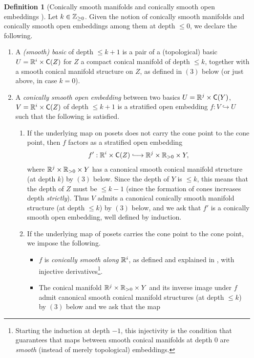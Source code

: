\documentclass[10pt, reqno, twoside
, final
]{amsart}
\numberwithin{equation}{subsection}%
\theoremstyle{definition}
\newtheorem{defn}{Definition}[subsection]
\theoremstyle{definition}
\theoremstyle{definition}
\theoremstyle{definition}
\theoremstyle{definition}
\theoremstyle{definition}
\theoremstyle{definition}
\theoremstyle{definition}
\theoremstyle{definition}
\theoremstyle{plain}
\theoremstyle{definition}
\theoremstyle{plain}
\theoremstyle{definition}
\theoremstyle{plain}
\theoremstyle{definition}
\theoremstyle{definition}
\theoremstyle{plain}
\theoremstyle{plain}
\theoremstyle{definition}
\theoremstyle{plain}
\theoremstyle{plain}
\theoremstyle{plain}
\begin{document}
\begin{defn}[Conically smooth manifolds and conically smooth open embeddings \cite{AFT-local-structures}]\label{defn:consmfmfd}
Let $k\in \mathbb{Z}_{\geq 0}$. Given the notion of conically smooth manifolds and conically smooth open embeddings among them at depth $\leq 0$, we declare the following. 
\begin{enumerate}[$(1)$]
    \item A \emph{(smooth) basic} of depth $\leq k+1$ is a pair of a (topological) basic $U=\mathbb{R}^i \times \mathsf{C}(Z)$ for $Z$ a compact conical manifold of depth $\leq k$, together with a smooth conical manifold structure on $Z$, as defined in $(3)$ below (or just above, in case $k=0$). 
    \item A \emph{conically smooth open embedding} between two basics $U=\mathbb{R}^j\times \mathsf{C}(Y)$, $V=\mathbb{R}^i\times \mathsf{C}(Z)$ of depth $\leq k+1$ is a stratified open embedding $f:V\hookrightarrow U$ such that the following is satisfied.
    \begin{enumerate}[$(i)$]
        \item If the underlying map on posets does not carry the cone point to the cone point, then $f$ factors as a stratified open embedding 
        \[ f':\R^i\times \mathsf{C}(Z) \hooklongrightarrow \R^j\times\R_{>0}\times Y, \]
        where $\mathbb{R}^j\times\mathbb{R}_{>0}\times Y$ has a canonical smooth conical manifold structure (at depth $k$) by $(3)$ below. Since the depth of $Y$ is $\leq k$, this means that the depth of $Z$ must be $\leq k-1$ (since the formation of cones increases depth \emph{strictly}). Thus $V$ admits a canonical conically smooth manifold structure (at depth $\leq k$) by $(3)$ below, and we ask that $f'$ is a conically smooth open embedding, well defined by induction.
        \item If the underlying map of posets carries the cone point to the cone point, we impose the following.
        \begin{itemize}
            \item $f$ is \emph{conically smooth along} $\mathbb{R}^i$, as defined and explained in \cite[Section 3.1]{AFT-local-structures}, with injective derivatives\footnote{Starting the induction at depth $-1$, this injectivity is the condition that guarantees that maps between smooth conical manifolds at depth $0$ are \emph{smooth} (instead of merely topological) embeddings.}. 
            \item The conical manifold $\mathbb{R}^j\times \mathbb{R}_{>0}\times Y$  and its inverse image under $f$ admit canonical smooth conical manifold structures (at depth $\leq k$) by $(3)$ below and we ask that the map

\end{itemize}
\end{enumerate}
\end{enumerate}
\end{defn}
\end{document}
